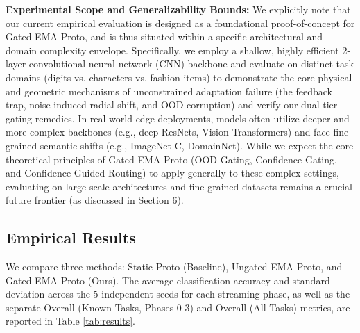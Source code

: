 \documentclass{article}
\theoremstyle{plain}
\theoremstyle{definition}
\theoremstyle{remark}
\begin{document}
\textbf{Experimental Scope and Generalizability Bounds:} We explicitly note that our current empirical evaluation is designed as a foundational proof-of-concept for Gated EMA-Proto, and is thus situated within a specific architectural and domain complexity envelope. Specifically, we employ a shallow, highly efficient 2-layer convolutional neural network (CNN) backbone and evaluate on distinct task domains (digits vs. characters vs. fashion items) to demonstrate the core physical and geometric mechanisms of unconstrained adaptation failure (the feedback trap, noise-induced radial shift, and OOD corruption) and verify our dual-tier gating remedies. In real-world edge deployments, models often utilize deeper and more complex backbones (e.g., deep ResNets, Vision Transformers) and face fine-grained semantic shifts (e.g., ImageNet-C, DomainNet). While we expect the core theoretical principles of Gated EMA-Proto (OOD Gating, Confidence Gating, and Confidence-Guided Routing) to apply generally to these complex settings, evaluating on large-scale architectures and fine-grained datasets remains a crucial future frontier (as discussed in Section 6).

\subsection{Empirical Results}
We compare three methods: Static-Proto (Baseline), Ungated EMA-Proto, and Gated EMA-Proto (Ours). The average classification accuracy and standard deviation across the 5 independent seeds for each streaming phase, as well as the separate Overall (Known Tasks, Phases 0-3) and Overall (All Tasks) metrics, are reported in Table \ref{tab:results}.
\end{document}

